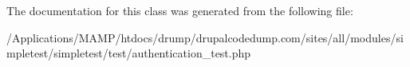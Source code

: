 The documentation for this class was generated from the following file:\begin{DoxyCompactItemize}
\item 
/Applications/MAMP/htdocs/drump/drupalcodedump.com/sites/all/modules/simpletest/simpletest/test/authentication\_\-test.php\end{DoxyCompactItemize}

